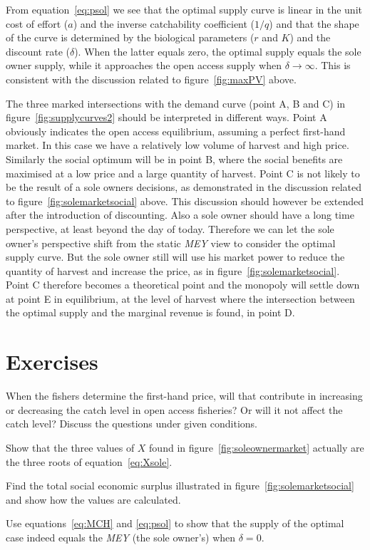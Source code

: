 \documentclass[11pt,fleqn]{book} %
\begin{document}
From equation~\ref{eq:psol} we see that the optimal supply curve is linear in the unit cost of effort ($a$) and the inverse catchability coefficient ($1/q$) and that the shape of the curve is determined by the biological parameters ($r$ and $K$) and the discount rate ($\delta$). When the latter equals zero, the optimal supply equals the sole owner supply, while it approaches the open access supply when $\delta \to \infty$. This is consistent with the discussion related to figure~\ref{fig:maxPV} above.

The three marked intersections with the demand curve (point A, B and C) in figure~\ref{fig:supplycurves2} should be interpreted in different ways. Point A obviously indicates the open access equilibrium, assuming a perfect first-hand market. In this case we have a relatively low volume of harvest and high price. Similarly the social optimum will be in point B, where the social benefits are maximised at a low price and a large quantity of harvest. Point C is not likely to be the result of a sole owners decisions, as demonstrated in the discussion related to figure~\ref{fig:solemarketsocial} above. This discussion should however be extended after the introduction of discounting. Also a sole owner should have a long time perspective, at least beyond the day of today. Therefore we can let the sole owner's perspective shift from the static \textit{MEY} view to consider the optimal supply curve. But the sole owner still will use his market power to reduce the quantity of harvest and increase the price, as in figure~\ref{fig:solemarketsocial}. Point C therefore becomes a theoretical point and the monopoly will settle down at point E in equilibrium, at the level of harvest where the intersection between the optimal supply and the marginal revenue is found, in point D.

\section*{Exercises}

\begin{exercise}
When the fishers determine the first-hand price, will that contribute in increasing or decreasing the catch level in open access fisheries? Or will it not affect the catch level? Discuss the questions under given conditions.
\end{exercise}
\begin{exercise}
Show that the three values of $X$ found in figure~\ref{fig:soleownermarket} actually are the three roots of equation~\ref{eq:Xsole}.
\end{exercise}
\begin{exercise}
Find the total social economic surplus illustrated in figure~\ref{fig:solemarketsocial} and show how the values are calculated.
\end{exercise}
\begin{exercise}
Use equations~\ref{eq:MCH} and \ref{eq:psol} to show that the supply of the optimal case indeed equals the \textit{MEY} (the sole owner's) when $\delta = 0$.
\end{exercise}
\end{document}
